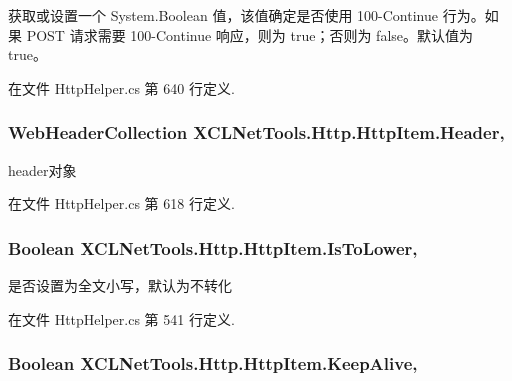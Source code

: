 获取或设置一个 System.\-Boolean 值，该值确定是否使用 100-\/\-Continue 行为。如果 P\-O\-S\-T 请求需要 100-\/\-Continue 响应，则为 true；否则为 false。默认值为 true。 



在文件 Http\-Helper.\-cs 第 640 行定义.

\hypertarget{class_x_c_l_net_tools_1_1_http_1_1_http_item_aae9b9613f672edb6ad77edd5c9a50f8d}{
\subsubsection[{Header}]{\setlength{\rightskip}{0pt plus 5cm}Web\-Header\-Collection X\-C\-L\-Net\-Tools.\-Http.\-Http\-Item.\-Header\hspace{0.3cm}{\ttfamily [get]}, {\ttfamily [set]}}}\label{class_x_c_l_net_tools_1_1_http_1_1_http_item_aae9b9613f672edb6ad77edd5c9a50f8d}


header对象 



在文件 Http\-Helper.\-cs 第 618 行定义.

\hypertarget{class_x_c_l_net_tools_1_1_http_1_1_http_item_a4d89b40173001bf219360543ee506994}{
\subsubsection[{Is\-To\-Lower}]{\setlength{\rightskip}{0pt plus 5cm}Boolean X\-C\-L\-Net\-Tools.\-Http.\-Http\-Item.\-Is\-To\-Lower\hspace{0.3cm}{\ttfamily [get]}, {\ttfamily [set]}}}\label{class_x_c_l_net_tools_1_1_http_1_1_http_item_a4d89b40173001bf219360543ee506994}


是否设置为全文小写，默认为不转化 



在文件 Http\-Helper.\-cs 第 541 行定义.

\hypertarget{class_x_c_l_net_tools_1_1_http_1_1_http_item_a42a8f7d1879653367435ba120fcbe432}{
\subsubsection[{Keep\-Alive}]{\setlength{\rightskip}{0pt plus 5cm}Boolean X\-C\-L\-Net\-Tools.\-Http.\-Http\-Item.\-Keep\-Alive\hspace{0.3cm}{\ttfamily [get]}, {\ttfamily [set]}}}\label{class_x_c_l_net_tools_1_1_http_1_1_http_item_a42a8f7d1879653367435ba120fcbe432}


